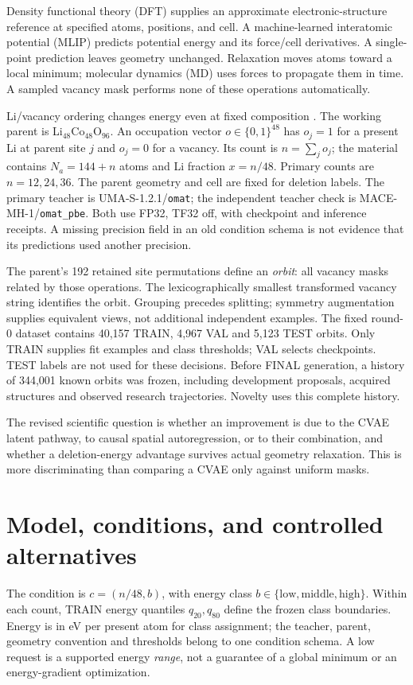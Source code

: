 \documentclass[10pt]{article}
\begin{document}
Density functional theory (DFT) supplies an approximate electronic-structure
reference at specified atoms, positions, and cell. A machine-learned interatomic
potential (MLIP) predicts potential energy and its force/cell derivatives. A
single-point prediction leaves geometry unchanged. Relaxation moves atoms toward
a local minimum; molecular dynamics (MD) uses forces to propagate them in time.
A sampled vacancy mask performs none of these operations automatically.

Li/vacancy ordering changes energy even at fixed composition
\cite{vanderVen1998}. The working parent is Li$_{48}$Co$_{48}$O$_{96}$.
An occupation vector $o\in\{0,1\}^{48}$ has $o_j=1$ for a present Li at parent
site $j$ and $o_j=0$ for a vacancy. Its count is $n=\sum_j o_j$; the material
contains $N_a=144+n$ atoms and Li fraction $x=n/48$. Primary counts are
$n=12,24,36$. The parent geometry and cell are fixed for deletion labels.
The primary teacher is UMA-S-1.2.1/\texttt{omat}; the independent teacher check is
MACE-MH-1/\texttt{omat\_pbe}. Both use FP32, TF32 off, with checkpoint and
inference receipts. A missing precision field in an old condition schema is not
evidence that its predictions used another precision.

The parent's 192 retained site permutations define an \emph{orbit}: all vacancy
masks related by those operations. The lexicographically smallest transformed
vacancy string identifies the orbit. Grouping precedes splitting; symmetry
augmentation supplies equivalent views, not additional independent examples.
The fixed round-0 dataset contains 40,157 TRAIN, 4,967 VAL and 5,123 TEST orbits.
Only TRAIN supplies fit examples and class thresholds; VAL selects checkpoints.
TEST labels are not used for these decisions. Before FINAL generation, a history
of 344,001 known orbits was frozen, including development proposals, acquired
structures and observed research trajectories. Novelty uses this complete history.

The revised scientific question is whether an improvement is due to the CVAE
latent pathway, to causal spatial autoregression, or to their combination, and
whether a deletion-energy advantage survives actual geometry relaxation.
This is more discriminating than comparing a CVAE only against uniform masks.
\newpage

\section{Model, conditions, and controlled alternatives}
The condition is $c=(n/48,b)$, with energy class $b\in\{\mathrm{low},\mathrm{middle},
\mathrm{high}\}$. Within each count, TRAIN energy quantiles $q_{20},q_{80}$ define
the frozen class boundaries. Energy is in eV per present atom for class
assignment; the teacher, parent, geometry convention and thresholds belong to
one condition schema. A low request is a supported energy \emph{range}, not a
guarantee of a global minimum or an energy-gradient optimization.
\end{document}
